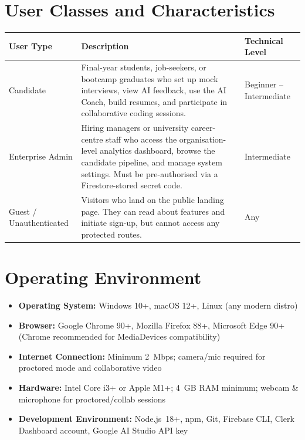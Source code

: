 \documentclass{fisatinternship}
\begin{document}
\section{User Classes and Characteristics}

\begin{longtable}{|p{3.2cm}|p{6cm}|p{2.5cm}|}
\hline
\textbf{User Type} & \textbf{Description} & \textbf{Technical Level} \\
\hline
\endhead
Candidate &
  Final-year students, job-seekers, or bootcamp graduates who set up mock interviews,
  view AI feedback, use the AI Coach, build resumes, and participate in collaborative
  coding sessions. &
  Beginner -- Intermediate \\
\hline
Enterprise Admin &
  Hiring managers or university career-centre staff who access the organisation-level
  analytics dashboard, browse the candidate pipeline, and manage system settings.
  Must be pre-authorised via a Firestore-stored secret code. &
  Intermediate \\
\hline
Guest / Unauthenticated &
  Visitors who land on the public landing page. They can read about features and
  initiate sign-up, but cannot access any protected routes. &
  Any \\
\hline
\end{longtable}

\section{Operating Environment}
\begin{itemize}
  \item \textbf{Operating System:} Windows 10+, macOS 12+, Linux (any modern distro)
  \item \textbf{Browser:} Google Chrome 90+, Mozilla Firefox 88+, Microsoft Edge 90+
        (Chrome recommended for MediaDevices compatibility)
  \item \textbf{Internet Connection:} Minimum 2~Mbps; camera/mic required for proctored
        mode and collaborative video
  \item \textbf{Hardware:} Intel Core i3+ or Apple M1+; 4~GB RAM minimum;
        webcam \& microphone for proctored/collab sessions
  \item \textbf{Development Environment:} Node.js~18+, npm, Git, Firebase CLI,
        Clerk Dashboard account, Google AI Studio API key
\end{itemize}
\end{document}
